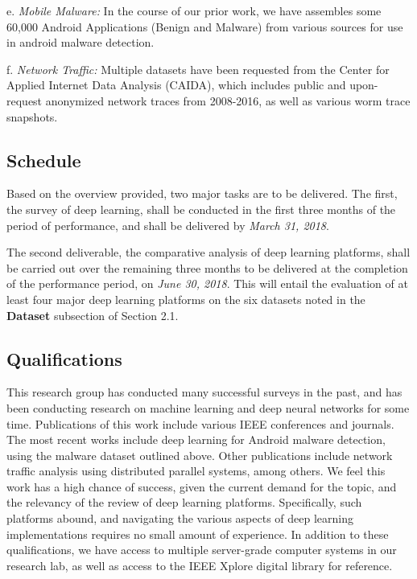 \documentclass[12pt]{article}
\begin{document}
\begin{flushleft}
		\hspace{4ex} e. \textit{Mobile Malware:} In the course of our prior work, we have assembles some 60,000 Android Applications (Benign and Malware) from various sources for use in android malware detection.  
		
		\hspace{4ex} f. \textit{Network Traffic:} Multiple datasets have been requested from the Center for Applied Internet Data Analysis (CAIDA), which includes public and upon-request anonymized network traces from 2008-2016, as well as various worm trace snapshots.
		
	\end{flushleft} 
	
	\subsection{Schedule}\hspace{4ex}Based on the overview provided, two major tasks are to be delivered. The first, the survey of deep learning, shall be conducted in the first three months of the period of performance, and shall be delivered by {\em March 31, 2018}. 
	
	The second deliverable, the comparative analysis of deep learning platforms, shall be carried out over the remaining three months to be delivered at the completion of the performance period, on {\em June 30, 2018}. This will entail the evaluation of at least four major deep learning platforms on the six datasets noted in the \textbf{Dataset} subsection of Section 2.1. 
	
	\subsection{Qualifications}\hspace{4ex}This research group has conducted many successful surveys in the past, and has been conducting research on machine learning and deep neural networks for some time. Publications of this work include various IEEE conferences and journals. The most recent works include deep learning for Android malware detection, using the malware dataset outlined above. Other publications include network traffic analysis using distributed parallel systems, among others. We feel this work has a high chance of success, given the current demand for the topic, and the relevancy of the review of deep learning platforms. Specifically, such platforms abound, and navigating the various aspects of deep learning implementations requires no small amount of experience. In addition to these qualifications, we have access to multiple server-grade computer systems in our research lab, as well as access to the IEEE Xplore digital library for reference.   
\end{document}
